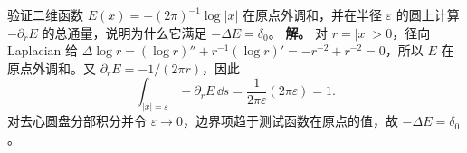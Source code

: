 \par
\begin{workedexample}
验证二维函数 \(E(x)=-(2\pi)^{-1}\log|x|\) 在原点外调和，并在半径 \(\varepsilon\) 的圆上计算 \(-\partial_rE\) 的总通量，说明为什么它满足 \(-\Delta E=\delta_0\)。
\textbf{解。} 对 \(r=|x|>0\)，径向 Laplacian 给 \(\Delta\log r=(\log r)''+r^{-1}(\log r)'=-r^{-2}+r^{-2}=0\)，所以 \(E\) 在原点外调和。又 \(\partial_rE=-1/(2\pi r)\)，因此
\[
\int_{|x|=\varepsilon}-\partial_rE\,\dd s=\frac1{2\pi\varepsilon}(2\pi\varepsilon)=1.
\]
对去心圆盘分部积分并令 \(\varepsilon\to0\)，边界项趋于测试函数在原点的值，故 \(-\Delta E=\delta_0\)。
\end{workedexample}
\par
